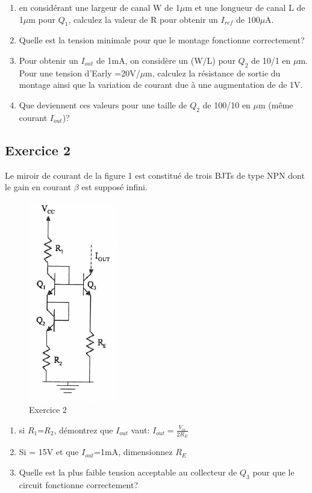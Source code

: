 \documentclass[paper=a4, fontsize=11pt]{article} %
\numberwithin{equation}{section} %
\numberwithin{figure}{section} %
\numberwithin{table}{section} %
\begin{document}
\begin{enumerate}
\item en considérant une largeur de canal W de 1$\mu$m et une longueur de canal L de 1$\mu$m pour $Q_1$, calculez la valeur de R pour obtenir un $I_{ref}$ de $100\mu$A.
\item Quelle est la tension \vout minimale pour que le montage fonctionne correctement?
\item Pour obtenir un $I_{out}$ de 1mA, on considère un (W/L) pour $Q_2$ de 10/1 en $\mu$m. Pour une tension d'Early \vea=20V/$\mu$m, calculez la résistance de sortie du montage ainsi que la variation de courant due à une augmentation de \vout de 1V.
\item Que deviennent ces valeurs pour une taille de $Q_2$ de 100/10 en $\mu$m (même courant $I_{out}$)?
\end{enumerate}


\subsection*{Exercice 2}
Le miroir de courant de la figure 1 est constitué de trois BJTs de type NPN dont le gain en courant $\beta$ est supposé infini.

\begin{figure}[!htbp]
   \centering
   \includegraphics[]{figure/fig13-2.png}
   \caption{Exercice 2}
   \label{fig13-2}
\end{figure}

\begin{enumerate}
\item si $R_1$=$R_2$, démontrez que $I_{out}$ vaut: $I_{out} = \frac{V_{cc}}{2R_E}$
\item Si \vcc = 15V et que $I_{out}$=1mA, dimensionnez $R_E$
\item Quelle est la plus faible tension acceptable au collecteur de $Q_3$ pour que le circuit fonctionne correctement?
\end{enumerate}
\end{document}
